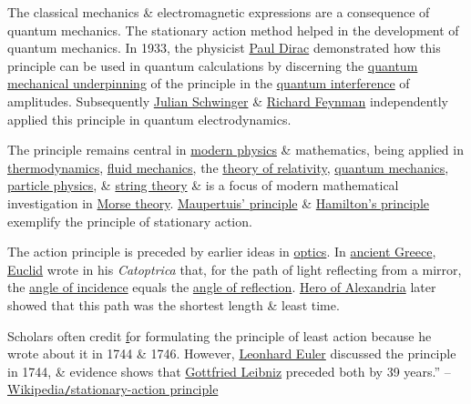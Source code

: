 \documentclass{article}
\begin{document}
The classical mechanics \& electromagnetic expressions are a consequence of quantum mechanics. The stationary action method helped in the development of quantum mechanics. In 1933, the physicist \href{https://en.wikipedia.org/wiki/Paul_Dirac}{Paul Dirac} demonstrated how this principle can be used in quantum calculations by discerning the \href{https://en.wikipedia.org/wiki/Path_integral_formulation#Quantum_action_principle}{quantum mechanical underpinning} of the principle in the \href{https://en.wikipedia.org/wiki/Interference_(wave_propagation)#Quantum_interference}{quantum interference} of amplitudes. Subsequently \href{https://en.wikipedia.org/wiki/Julian_Schwinger}{Julian Schwinger} \& \href{https://en.wikipedia.org/wiki/Richard_Feynman}{Richard Feynman} independently applied this principle in quantum electrodynamics.

The principle remains central in \href{https://en.wikipedia.org/wiki/Modern_physics}{modern physics} \& mathematics, being applied in \href{https://en.wikipedia.org/wiki/Thermodynamics}{thermodynamics}, \href{https://en.wikipedia.org/wiki/Fluid_mechanics}{fluid mechanics}, the \href{https://en.wikipedia.org/wiki/Theory_of_relativity}{theory of relativity}, \href{https://en.wikipedia.org/wiki/Quantum_mechanics}{quantum mechanics}, \href{https://en.wikipedia.org/wiki/Particle_physics}{particle physics}, \& \href{https://en.wikipedia.org/wiki/String_theory}{string theory} \& is a focus of modern mathematical investigation in \href{https://en.wikipedia.org/wiki/Morse_theory}{Morse theory}. \href{https://en.wikipedia.org/wiki/Maupertuis%27_principle}{Maupertuis' principle} \& \href{https://en.wikipedia.org/wiki/Hamilton%27s_principle}{Hamilton's principle} exemplify the principle of stationary action.

The action principle is preceded by earlier ideas in \href{https://en.wikipedia.org/wiki/Optics}{optics}. In \href{https://en.wikipedia.org/wiki/Ancient_Greece}{ancient Greece}, \href{https://en.wikipedia.org/wiki/Euclid}{Euclid} wrote in his \textit{Catoptrica} that, for the path of light reflecting from a mirror, the \href{https://en.wikipedia.org/wiki/Angle_of_incidence_(optics)}{angle of incidence} equals the \href{https://en.wikipedia.org/wiki/Angle_of_reflection}{angle of reflection}. \href{https://en.wikipedia.org/wiki/Hero_of_Alexandria}{Hero of Alexandria} later showed that this path was the shortest length \& least time.

Scholars often credit \href{Pierre Louis Maupertuis} for formulating the principle of least action because he wrote about it in 1744 \& 1746. However, \href{https://en.wikipedia.org/wiki/Leonhard_Euler}{Leonhard Euler} discussed the principle in 1744, \& evidence shows that \href{https://en.wikipedia.org/wiki/Gottfried_Leibniz}{Gottfried Leibniz} preceded both by 39 years.'' -- \href{https://en.wikipedia.org/wiki/Stationary-action_principle}{Wikipedia{\tt/}stationary-action principle}
\end{document}
